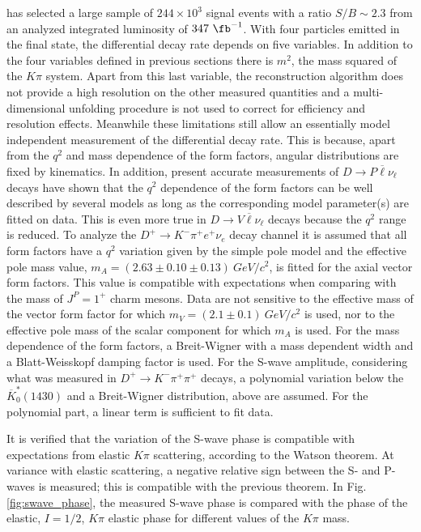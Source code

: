 \babar \cite{delAmoSanchez:2010fd} has selected a large sample of $244\times 10^3$ signal events with a ratio $S/B\sim 2.3$ from an analyzed integrated
luminosity of $347~\fb^{-1}$. With four particles emitted in the final state, 
the differential decay rate depends on five variables.
In addition to the four variables defined in previous sections there is 
$m^2$, the mass squared of the $K\pi$ system.
Apart from this last variable, the reconstruction algorithm does not provide 
a high resolution on the other measured quantities 
and a multi-dimensional unfolding procedure
is not used to correct for efficiency and resolution effects. Meanwhile these
limitations still allow an essentially model independent measurement of
the differential decay rate. This is because, apart from the $q^2$
and mass dependence of the form factors, angular distributions are fixed by
kinematics. In addition, present accurate measurements of 
$D \rightarrow P \overline{\ell}\nu_{\ell}$ decays have shown that the 
$q^2$ dependence of the form factors can be well described by several models
as long as the corresponding model parameter(s) are fitted on data.
This is even more true in $D \rightarrow V \overline{\ell}\nu_{\ell}$ decays
because the $q^2$ range is reduced. To analyze the
$D^+ \rightarrow K^- \pi^+ e^+ \nu_e$ decay channel it is assumed
that all form factors have a $q^2$ variation given by
the simple pole model and the effective pole mass value,
 $m_A=(2.63 \pm 0.10 \pm 0.13)~GeV/c^2$,
is fitted
for the axial vector form factors. This value is compatible
with expectations when comparing with the mass
of $J^P=1^+$ charm mesons. Data are not sensitive to the effective mass
of the vector form factor for which $m_V=(2.1 \pm 0.1)~GeV/c^2$ is used,
nor to the effective pole mass of the scalar component for which $m_A$ is used.
 For the mass dependence of the form factors,
a Breit-Wigner with a mass dependent width and a Blatt-Weisskopf damping factor
is used. For the S-wave amplitude, considering
what was measured in $D^+ \rightarrow K^- \pi^+\pi^+$ decays,
a polynomial variation below the $\overline{K}^*_0(1430)$
and a Breit-Wigner distribution, above are assumed. For the polynomial part, 
a linear term is sufficient to fit data.

It is verified that the variation of the S-wave phase is compatible 
with expectations from elastic $K\pi$ scattering, according
to the Watson theorem. At variance with elastic scattering, 
a negative relative sign between the S- and P-waves is measured; 
this is compatible with 
the previous theorem. In Fig. \ref{fig:swave_phase}, the measured
S-wave phase is compared with the phase of the elastic, $I=1/2$,
$K\pi$ elastic phase for different values of the $K\pi$ mass.

